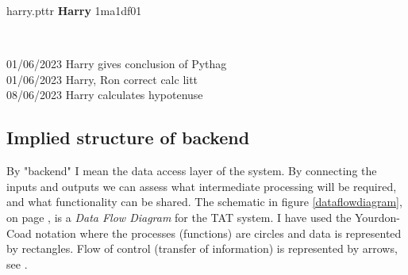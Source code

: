 \documentclass[10pt]{article}
\begin{document}
\begin{center}
\begin{tcolorbox}

harry.pttr \hfill \textbf{Harry} \hfill 1ma1df01

\

\small{
01/06/2023 Harry gives conclusion of Pythag \\
01/06/2023 Harry, Ron correct calc litt \\
08/06/2023 Harry calculates hypotenuse
}

\vspace{10mm}

\begin{center}
\end{center}

\end{tcolorbox}
\end{center}


\subsection{Implied structure of backend}

By "backend" I mean the data access layer of the system. By connecting the inputs and outputs we can assess what intermediate processing will be required, and what functionality can be shared. The schematic in figure \ref{dataflowdiagram}, on page \pageref{dataflowdiagram}, is a \emph{Data Flow Diagram} for the TAT system. I have used the Yourdon-Coad notation where the processes (functions) are circles and data is represented by rectangles. Flow of control (transfer of information) is represented by arrows, see \cite{Coad91}.
\end{document}
